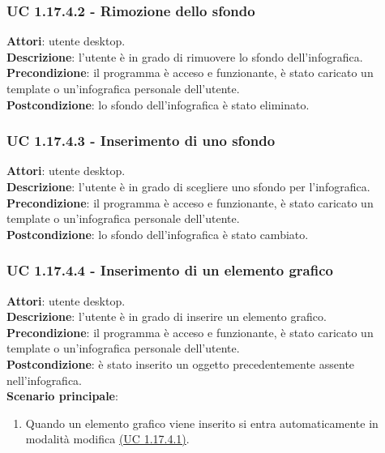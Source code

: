 \subsubsection{UC 1.17.4.2 - Rimozione dello sfondo}{
	\label{uc1.17.4.2}
	\textbf{Attori}: utente desktop. \\
	\textbf{Descrizione}: l'utente è in grado di rimuovere lo sfondo dell’infografica. \\
	\textbf{Precondizione}: il programma è acceso e funzionante, è stato caricato un template o un'infografica personale dell'utente.	\\
	\textbf{Postcondizione}: lo sfondo dell'infografica è stato eliminato.
	}
\subsubsection{UC 1.17.4.3 - Inserimento di uno sfondo}{
	\label{uc1.17.4.3}
	\textbf{Attori}: utente desktop. \\
	\textbf{Descrizione}: l'utente è in grado di scegliere uno sfondo per l'infografica. \\
	\textbf{Precondizione}: il programma è acceso e funzionante, è stato caricato un template o un'infografica personale dell'utente.	\\
	\textbf{Postcondizione}: lo sfondo dell'infografica è stato cambiato.
	}
\subsubsection{UC 1.17.4.4 - Inserimento di un elemento grafico}{
	\label{uc1.17.4.4}
	\textbf{Attori}: utente desktop. \\
	\textbf{Descrizione}: l'utente è in grado di inserire un elemento grafico. \\
	\textbf{Precondizione}: il programma è acceso e funzionante, è stato caricato un template o un'infografica personale dell'utente.	\\
	\textbf{Postcondizione}: è stato inserito un oggetto precedentemente assente nell'infografica.\\
	\textbf{Scenario principale}:
	\begin{enumerate}
		\item Quando un elemento grafico viene inserito si entra automaticamente in modalità modifica \hyperref[uc1.17.4.1]{(UC 1.17.4.1)}.
	\end{enumerate}
	}
